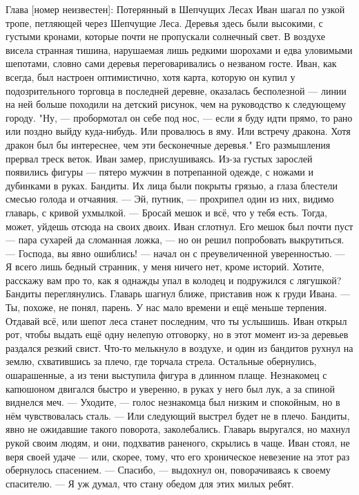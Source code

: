 \documentclass[12pt,a4paper]{book}
\begin{document}
Глава [номер неизвестен]: Потерянный в Шепчущих Лесах
Иван шагал по узкой тропе, петляющей через Шепчущие Леса. Деревья здесь были высокими, с густыми кронами, которые почти не пропускали солнечный свет. В воздухе висела странная тишина, нарушаемая лишь редкими шорохами и едва уловимыми шепотами, словно сами деревья переговаривались о незваном госте. Иван, как всегда, был настроен оптимистично, хотя карта, которую он купил у подозрительного торговца в последней деревне, оказалась бесполезной — линии на ней больше походили на детский рисунок, чем на руководство к следующему городу.
"Ну, — пробормотал он себе под нос, — если я буду идти прямо, то рано или поздно выйду куда-нибудь. Или провалюсь в яму. Или встречу дракона. Хотя дракон был бы интереснее, чем эти бесконечные деревья."
Его размышления прервал треск веток. Иван замер, прислушиваясь. Из-за густых зарослей появились фигуры — пятеро мужчин в потрепанной одежде, с ножами и дубинками в руках. Бандиты. Их лица были покрыты грязью, а глаза блестели смесью голода и отчаяния.
— Эй, путник, — прохрипел один из них, видимо главарь, с кривой ухмылкой. — Бросай мешок и всё, что у тебя есть. Тогда, может, уйдешь отсюда на своих двоих.
Иван сглотнул. Его мешок был почти пуст — пара сухарей да сломанная ложка, — но он решил попробовать выкрутиться.
— Господа, вы явно ошиблись! — начал он с преувеличенной уверенностью. — Я всего лишь бедный странник, у меня ничего нет, кроме историй. Хотите, расскажу вам про то, как я однажды упал в колодец и подружился с лягушкой?
Бандиты переглянулись. Главарь шагнул ближе, приставив нож к груди Ивана.
— Ты, похоже, не понял, парень. У нас мало времени и ещё меньше терпения. Отдавай всё, или шепот леса станет последним, что ты услышишь.
Иван открыл рот, чтобы выдать ещё одну нелепую отговорку, но в этот момент из-за деревьев раздался резкий свист. Что-то мелькнуло в воздухе, и один из бандитов рухнул на землю, схватившись за плечо, где торчала стрела. Остальные обернулись, ошарашенные, а из тени выступила фигура в длинном плаще. Незнакомец с капюшоном двигался быстро и уверенно, в руках у него был лук, а за спиной виднелся меч.
— Уходите, — голос незнакомца был низким и спокойным, но в нём чувствовалась сталь. — Или следующий выстрел будет не в плечо.
Бандиты, явно не ожидавшие такого поворота, заколебались. Главарь выругался, но махнул рукой своим людям, и они, подхватив раненого, скрылись в чаще. Иван стоял, не веря своей удаче — или, скорее, тому, что его хроническое невезение на этот раз обернулось спасением.
— Спасибо, — выдохнул он, поворачиваясь к своему спасителю. — Я уж думал, что стану обедом для этих милых ребят.
\end{document}
